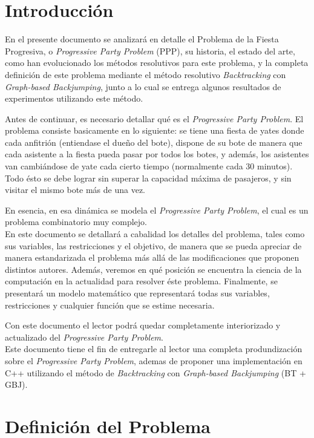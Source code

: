 \documentclass[letter, 10pt]{article}
\begin{document}
\section{Introducción}
En el presente documento se analizará en detalle el Problema de la Fiesta Progresiva, o \textit{Progressive Party Problem} (PPP), su historia, el estado del arte, como han evolucionado los métodos resolutivos para este problema, y la completa definición de este problema mediante el método resolutivo \textit{Backtracking} con \textit{Graph-based Backjumping}, junto a lo cual se entrega algunos resultados de experimentos utilizando este método.

Antes de continuar, es necesario detallar qué es el \textit{Progressive Party Problem}. El problema consiste basicamente en lo siguiente: se tiene una fiesta de yates donde cada anfitrión (entiendase el dueño del bote), dispone de su bote de manera que cada asistente a la fiesta pueda pasar por todos los botes, y además, los asistentes van cambiándose de yate cada cierto tiempo (normalmente cada 30 minutos). Todo ésto se debe lograr sin superar la capacidad máxima de pasajeros, y sin visitar el mismo bote más de una vez.

En esencia, en esa dinámica se modela el \textit{Progressive Party Problem}, el cual es un problema combinatorio muy complejo.\\

En este documento se detallará a cabalidad los detalles del problema, tales como sus variables, las restricciones y el objetivo, de manera que se pueda apreciar de manera estandarizada el problema más allá de las modificaciones que proponen distintos autores. Además, veremos en qué posición se encuentra la ciencia de la computación en la actualidad para resolver éste problema. Finalmente, se presentará un modelo matemático que representará todas sus variables, restricciones y cualquier función que se estime necesaria.

Con este documento el lector podrá quedar completamente interiorizado y actualizado del \textit{Progressive Party Problem}.\\

Este documento tiene el fin de entregarle al lector una completa produndización sobre el \textit{Progressive Party Problem}, ademas de proponer una implementación en C++ utilizando el método de \textit{Backtracking} con \textit{Graph-based Backjumping} (BT + GBJ).

\section{Definición del Problema}
\end{document}
